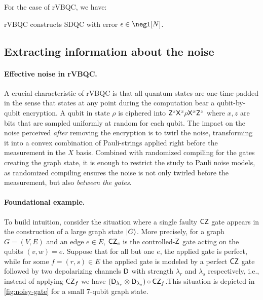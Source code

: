 For the case of rVBQC, we have:
\begin{theorem}
rVBQC constructs SDQC with error \(\epsilon \in \negl[N]\).
\end{theorem}

\subsection{Extracting information about the noise}

\paragraph{Effective noise in rVBQC.}
A crucial characteristic of rVBQC is that all quantum states are one-time-padded in the sense that states at any point during the computation bear a qubit-by-qubit encryption. A qubit in state \(\rho\) is ciphered into $\mathsf{Z}^z \mathsf{X}^x \rho \mathsf{X}^x \mathsf{Z}^z$ where \(x,z\) are bits that are sampled uniformly at random for each qubit. The impact on the noise perceived \emph{after} removing the encryption is to twirl the noise, transforming it into a convex combination of Pauli-strings applied right before the measurement in the $X$ basis. Combined with randomized compiling for the gates creating the graph state, it is enough to restrict the study to Pauli noise models, as randomized compiling ensures the noise is not only twirled before the measurement, but also \emph{between the gates}.


\paragraph{Foundational example.}
To build intuition, consider the situation where a single faulty $\mathsf{CZ}$ gate appears in the construction of a large graph state $\ket G$. More precisely, for a graph  \(G = (V,E)\) and an edge \(e  \in E\), \(\mathsf{CZ}_e\) is the controlled-\(\mathsf{Z}\) gate acting on the qubits \((v,w)=e\). Suppose that for all but one \(e\), the applied gate is perfect, while for some \(f=(r,s) \in E\) the applied gate is modeled by a perfect \(\mathsf{CZ}\) gate followed by two depolarizing channels \(\mathsf{D}\) with strength \(\lambda_r\)  and \(\lambda_s\) respectively, i.e., instead of applying \(\mathsf{CZ}_{f}\) we have \((\mathsf{D}_{\lambda_r} \otimes \mathsf{D}_{\lambda_s}) \circ \mathsf{CZ}_f\).This situation is depicted in \cref{fig:noisy-gate} for a small 7-qubit graph state.

